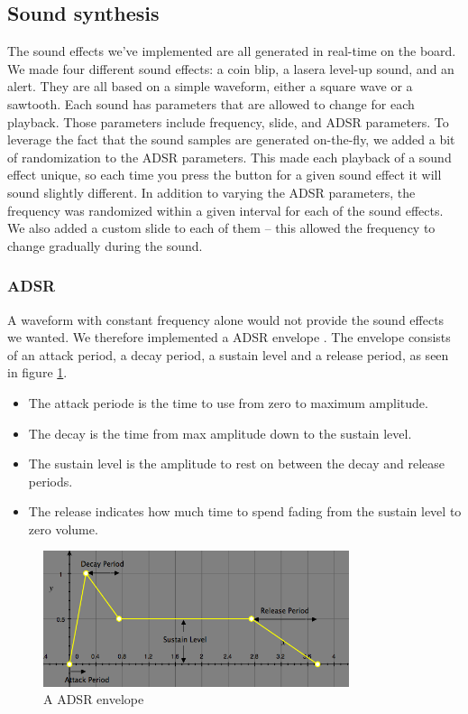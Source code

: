 \subsection{Sound synthesis}
The sound effects we've implemented are all generated in real-time on the board.
We made four different sound effects: a coin blip, a lasera level-up sound, and an alert.
They are all based on a simple waveform, either a square wave or a sawtooth.
Each sound has parameters that are allowed to change for each playback.
Those parameters include frequency, slide, and ADSR parameters.
To leverage the fact that the sound samples are generated on-the-fly, we added a bit of randomization to the ADSR parameters.
This made each playback of a sound effect unique, so each time you press the button for a given sound effect it will sound slightly different.
In addition to varying the ADSR parameters, the frequency was randomized within a given interval for each of the sound effects.
We also added a custom slide to each of them – this allowed the frequency to change gradually during the sound.

\subsubsection{ADSR}

A waveform with constant frequency alone would not provide the sound effects we wanted. We therefore implemented a ADSR envelope \cite{adsr}.
The envelope consists of an attack period, a decay period, a sustain level and a release period, as seen in figure \ref{fig:adsr_envelope}.

\begin{itemize}
    \item The attack periode is the time to use from zero to maximum amplitude.
    \item The decay is the time from max amplitude down to the sustain level.
    \item The sustain level is the amplitude to rest on between the decay and release periods.
    \item The release indicates how much time to spend fading from the sustain level to zero volume.
\end{itemize}

\begin{figure}[ht!]
    \begin{center}
    \includegraphics[width=0.8\textwidth]{assets/img/adsr.png}
    \caption{A ADSR envelope \cite{adsr}}
    \label{fig:adsr_envelope}
    \end{center}
\end{figure}

